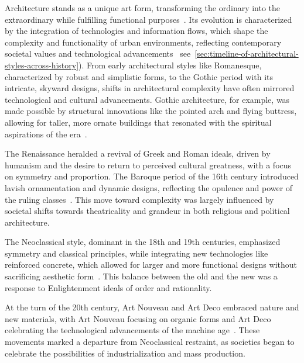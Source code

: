 
Architecture stands as a unique art form, transforming the ordinary into the extraordinary while fulfilling functional purposes~\cite{Jiang2023}.
Its evolution is characterized by the integration of technologies and information flows, which shape the complexity and functionality of urban environments, reflecting contemporary societal values and technological advancements~\cite{Leach2015} see~\ref{sec:timeline-of-architectural-styles-across-history}).
From early architectural styles like Romanesque, characterized by robust and simplistic forms, to the Gothic period with its intricate, skyward designs, shifts in architectural complexity have often mirrored technological and cultural advancements.
Gothic architecture, for example, was made possible by structural innovations like the pointed arch and flying buttress, allowing for taller, more ornate buildings that resonated with the spiritual aspirations of the era~\cite{Kennedy2013}.

The Renaissance heralded a revival of Greek and Roman ideals, driven by humanism and the desire to return to perceived cultural greatness, with a focus on symmetry and proportion.
The Baroque period of the 16th century introduced lavish ornamentation and dynamic designs, reflecting the opulence and power of the ruling classes~\cite{Marder1990}.
This move toward complexity was largely influenced by societal shifts towards theatricality and grandeur in both religious and political architecture.

The Neoclassical style, dominant in the 18th and 19th centuries, emphasized symmetry and classical principles, while integrating new technologies like reinforced concrete, which allowed for larger and more functional designs without sacrificing aesthetic form~\cite{Adebusuyi2022}.
This balance between the old and the new was a response to Enlightenment ideals of order and rationality.

At the turn of the 20th century, Art Nouveau and Art Deco embraced nature and new materials, with Art Nouveau focusing on organic forms and Art Deco celebrating the technological advancements of the machine age~\cite{Salas2018}.
These movements marked a departure from Neoclassical restraint, as societies began to celebrate the possibilities of industrialization and mass production.

